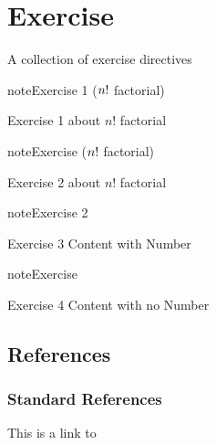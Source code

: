 

\pagestyle{empty}
\sphinxmaketitle
\pagestyle{plain}
\sphinxtableofcontents
\pagestyle{normal}
\label{\detokenize{index::doc}}


\sphinxstepscope


\chapter{Exercise}
\label{\detokenize{exercise:exercise}}\label{\detokenize{exercise::doc}}
\sphinxAtStartPar
A collection of exercise directives
 \label{exercise:exercise-1}

\begin{sphinxadmonition}{note}{Exercise 1 (\protect\(n!\protect\) factorial)}



\sphinxAtStartPar
Exercise 1 about \(n!\) factorial
\end{sphinxadmonition}
 \label{exercise:exercise-2}
\begin{sphinxadmonition}{note}{Exercise (\protect\(n!\protect\) factorial)}



\sphinxAtStartPar
Exercise 2 about \(n!\) factorial
\end{sphinxadmonition}
 \label{exercise:exercise-3}

\begin{sphinxadmonition}{note}{Exercise 2}



\sphinxAtStartPar
Exercise 3 Content with Number
\end{sphinxadmonition}
 \label{exercise:exercise-4}
\begin{sphinxadmonition}{note}{Exercise}



\sphinxAtStartPar
Exercise 4 Content with no Number
\end{sphinxadmonition}


\section{References}
\label{\detokenize{exercise:references}}

\subsection{Standard References}
\label{\detokenize{exercise:standard-references}}
\sphinxAtStartPar
This is a link to 

